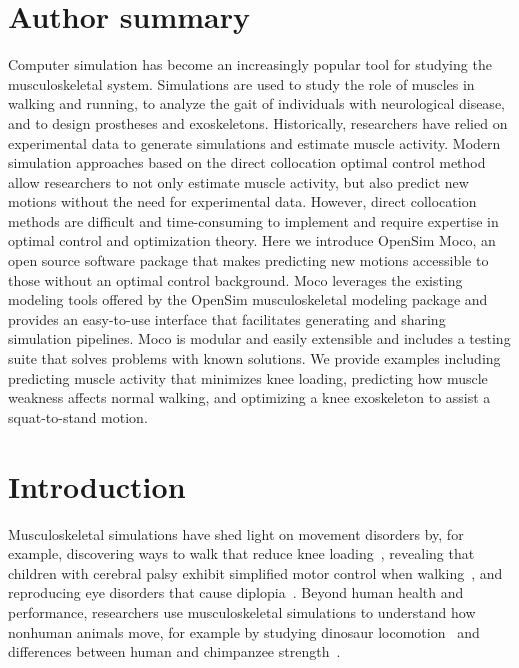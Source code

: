 \documentclass[10pt,letterpaper]{article}
\begin{document}
\section*{Author summary}
Computer simulation has become an increasingly popular tool for studying the musculoskeletal system. Simulations are used to study the role of muscles in walking and running, to analyze the gait of individuals with neurological disease, and to design prostheses and exoskeletons. Historically, researchers have relied on experimental data to generate simulations and estimate muscle activity. Modern simulation approaches based on the direct collocation optimal control method allow researchers to not only estimate muscle activity, but also predict new motions without the need for experimental data. However, direct collocation methods are difficult and time-consuming to implement and require expertise in optimal control and optimization theory. Here we introduce OpenSim Moco, an open source software package that makes predicting new motions accessible to those without an optimal control background. Moco leverages the existing modeling tools offered by the OpenSim musculoskeletal modeling package and provides an easy-to-use interface that facilitates generating and sharing simulation pipelines. Moco is modular and easily extensible and includes a testing suite that solves problems with known solutions. We provide examples including predicting muscle activity that minimizes knee loading, predicting how muscle weakness affects normal walking, and optimizing a knee exoskeleton to assist a squat-to-stand motion.

\linenumbers

\section*{Introduction}

Musculoskeletal simulations have shed light on movement disorders by, for example, discovering ways to walk that reduce knee loading~\cite{Fregly:2007ac}, revealing that children with cerebral palsy exhibit simplified motor control when walking~\cite{Steele:2015}, and reproducing eye disorders that cause diplopia~\cite{Priamikov:2016}. Beyond human health and performance, researchers use musculoskeletal simulations to understand how nonhuman animals move, for example by studying dinosaur locomotion~\cite{sthaya:2005uk} and differences between human and chimpanzee strength~\cite{ONeill:2017}.
\end{document}
